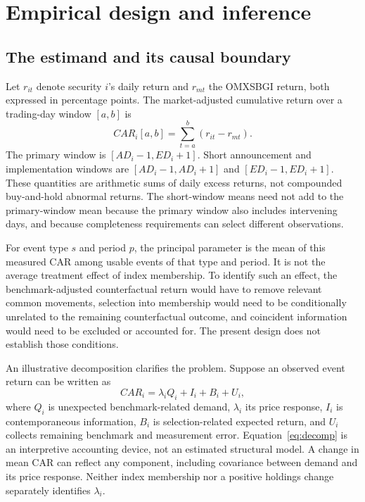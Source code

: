 \section{Empirical design and inference}
\subsection{The estimand and its causal boundary}

Let $r_{it}$ denote security $i$'s daily return and $r_{mt}$ the OMXSBGI return, both expressed in percentage points. The market-adjusted cumulative return over a trading-day window $[a,b]$ is
\begin{equation}
 CAR_i[a,b]=\sum_{t=a}^{b}(r_{it}-r_{mt}).
 \label{eq:car}
\end{equation}
The primary window is $[AD_i-1,ED_i+1]$. Short announcement and implementation windows are $[AD_i-1,AD_i+1]$ and $[ED_i-1,ED_i+1]$. These quantities are arithmetic sums of daily excess returns, not compounded buy-and-hold abnormal returns. The short-window means need not add to the primary-window mean because the primary window also includes intervening days, and because completeness requirements can select different observations.

For event type $s$ and period $p$, the principal parameter is the mean of this measured CAR among usable events of that type and period. It is not the average treatment effect of index membership. To identify such an effect, the benchmark-adjusted counterfactual return would have to remove relevant common movements, selection into membership would need to be conditionally unrelated to the remaining counterfactual outcome, and coincident information would need to be excluded or accounted for. The present design does not establish those conditions.

An illustrative decomposition clarifies the problem. Suppose an observed event return can be written as
\begin{equation}
 CAR_i=\lambda_i Q_i+I_i+B_i+U_i,
 \label{eq:decomp}
\end{equation}
where $Q_i$ is unexpected benchmark-related demand, $\lambda_i$ its price response, $I_i$ is contemporaneous information, $B_i$ is selection-related expected return, and $U_i$ collects remaining benchmark and measurement error. Equation~\eqref{eq:decomp} is an interpretive accounting device, not an estimated structural model. A change in mean CAR can reflect any component, including covariance between demand and its price response. Neither index membership nor a positive holdings change separately identifies $\lambda_i$.

